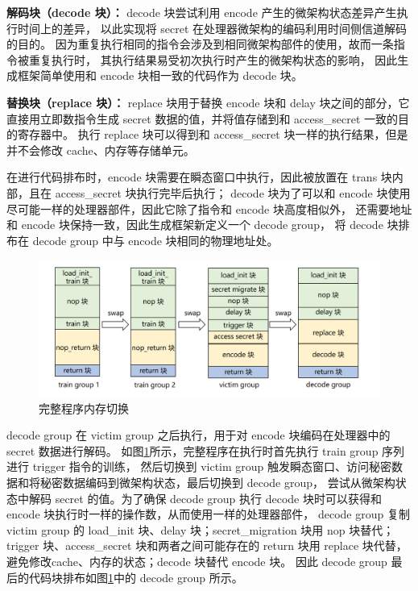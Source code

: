 \textbf{解码块（decode 块）：}
decode 块尝试利用 encode 产生的微架构状态差异产生执行时间上的差异，
以此实现将 secret 在处理器微架构的编码利用时间侧信道解码的目的。
因为重复执行相同的指令会涉及到相同微架构部件的使用，故而一条指令被重复执行时，
其执行结果易受初次执行时产生的微架构状态的影响，
因此生成框架简单使用和 encode 块相一致的代码作为 decode 块。\par

\textbf{替换块（replace 块）：}
replace 块用于替换 encode 块和 delay 块之间的部分，它直接用立即数指令生成 secret 数据的值，并将值存储到和 access\_secret 一致的目的寄存器中。
执行 replace 块可以得到和 access\_secret 块一样的执行结果，但是并不会修改 cache、内存等存储单元。

在进行代码排布时，encode 块需要在瞬态窗口中执行，因此被放置在 trans 块内部，且在 access\_secret 块执行完毕后执行；
decode 块为了可以和 encode 块使用尽可能一样的处理器部件，因此它除了指令和 encode 块高度相似外，
还需要地址和 encode 块保持一致，因此生成框架新定义一个 decode group，
将 decode 块排布在 decode group 中与 encode 块相同的物理地址处。\par

\begin{figure}[!h]
    \centering
    \includegraphics[width=\linewidth]{figure/paper/group-switch-all.png}
    \caption{完整程序内存切换}
    \label{paper:group-switch-all}
\end{figure}

decode group 在 victim group 之后执行，用于对 encode 块编码在处理器中的 secret 数据进行解码。
如图\ref{paper:group-switch-all}所示，完整程序在执行时首先执行 train group 序列进行 trigger 指令的训练，
然后切换到 victim group 触发瞬态窗口、访问秘密数据和将秘密数据编码到微架构状态，最后切换到 decode group，
尝试从微架构状态中解码 secret 的值。为了确保 decode group 执行 decode 块时可以获得和 encode 块执行时一样的操作数，从而使用一样的处理器部件，
decode group 复制 victim group 的 load\_init 块、delay 块；secret\_migration 块用 nop 块替代；
trigger 块、access\_secret 块和两者之间可能存在的 return 块用 replace 块代替，避免修改cache、内存的状态；decode 块替代 encode 块。
因此 decode group 最后的代码块排布如图\ref{paper:group-switch-all}中的 decode group 所示。\par

